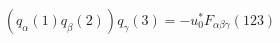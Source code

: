 \begin{equation}                      
(q_{\alpha}(1) q_{\beta}(2)) q_{\gamma}(3) = -u_{0}^{*}                       
F_{\alpha \beta \gamma}(123)                       
\end{equation} 

